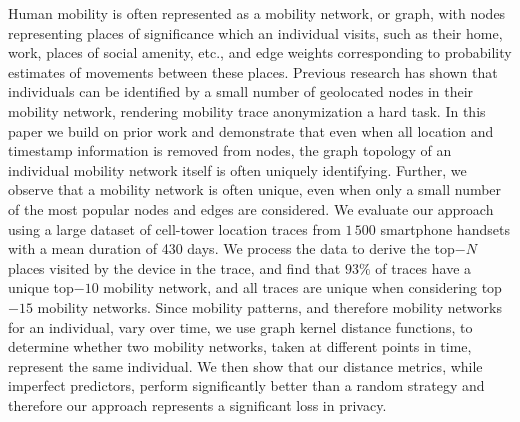
{Human mobility is often represented as a mobility network, or graph, with nodes representing places of significance which an individual visits, such as their home, work, places of social amenity, etc., and edge weights corresponding to probability estimates of movements between these places.
Previous research has shown that individuals can be identified by a small number of geolocated nodes in their mobility network, rendering mobility trace anonymization a hard task.
In this paper we build on prior work and demonstrate that even when all location and timestamp information is removed from nodes, the graph topology of an individual mobility network itself is often uniquely identifying. 
Further, we observe that a mobility network is often unique, even when only a small number of the most popular nodes and edges are considered. 
We evaluate our approach using a large dataset of cell-tower location traces from $1\,500$ smartphone handsets with a mean duration of 430 days.
We process the data to derive the top$-N$ places visited by the device in the trace, and find that $93\%$ of traces have a unique top$-10$ mobility network, and all traces are unique when considering top$-15$ mobility networks.
Since mobility patterns, and therefore mobility networks for an individual, vary over time, we use graph kernel distance functions, to determine whether two mobility networks, taken at different points in time, represent the same individual.
We then show that our distance metrics, while imperfect predictors, perform significantly better than a random strategy and therefore our approach represents a significant loss in privacy.}